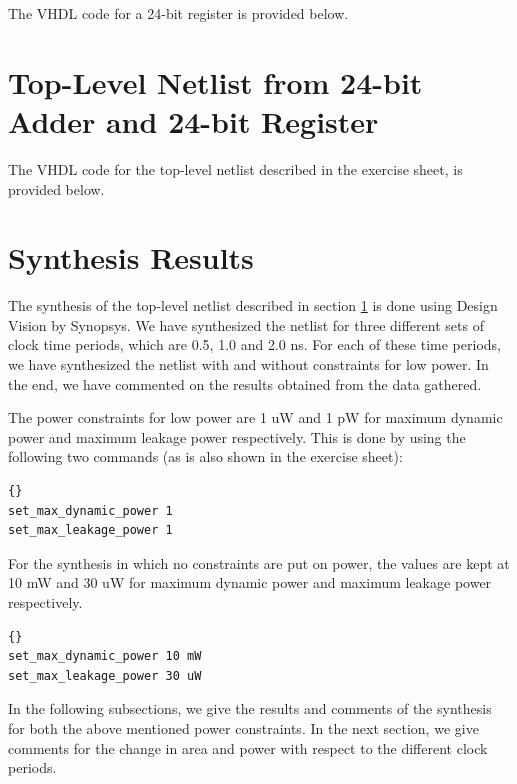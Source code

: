 \documentclass[11pt,a4paper]{article}
\begin{document}
The VHDL code for a 24-bit register is provided below.\\ 



\section{Top-Level Netlist from 24-bit Adder and 24-bit Register}
\label{sec:netlist}

The VHDL code for the top-level netlist described in the exercise sheet, is provided below.\\ 


\section{Synthesis Results}

The synthesis of the top-level netlist described in section \ref{sec:netlist} is done using Design Vision by Synopsys. We have synthesized the netlist for three different sets of clock time periods, which are 0.5, 1.0 and 2.0 ns. For each of these time periods, we have synthesized the netlist with and without constraints for low power. In the end, we have commented on the results obtained from the data gathered.

The power constraints for low power are 1 uW and 1 pW for maximum dynamic power and maximum leakage power respectively. This is done by using the following two commands (as is also shown in the exercise sheet):\\

\begin{lstlisting}[frame=trbl]{}
set_max_dynamic_power 1
set_max_leakage_power 1
\end{lstlisting}
\vspace{0.5cm}
For the synthesis in which no constraints are put on power, the values are kept at 10 mW and 30 uW for maximum dynamic power and maximum leakage power respectively.\\

\begin{lstlisting}[frame=trbl]{}
set_max_dynamic_power 10 mW
set_max_leakage_power 30 uW
\end{lstlisting}
\vspace{0.5cm}

In the following subsections, we give the results and comments of the synthesis for both the above mentioned power constraints. In the next section, we give comments for the change in area and power with respect to the different clock periods.
\end{document}
